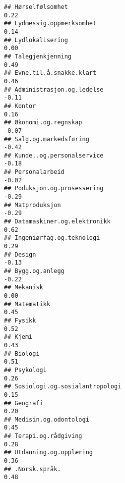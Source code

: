\documentclass[
]{article}
\begin{document}
\begin{verbatim}
## Hørselfølsomhet                                                                   0.22
## Lydmessig.oppmerksomhet                                                           0.14
## Lydlokalisering                                                                   0.00
## Talegjenkjenning                                                                  0.49
## Evne.til.å.snakke.klart                                                           0.46
## Administrasjon.og.ledelse                                                        -0.11
## Kontor                                                                            0.16
## Økonomi.og.regnskap                                                              -0.07
## Salg.og.markedsføring                                                            -0.42
## Kunde..og.personalservice                                                        -0.18
## Personalarbeid                                                                   -0.02
## Poduksjon.og.prosessering                                                        -0.29
## Matproduksjon                                                                    -0.29
## Datamaskiner.og.elektronikk                                                       0.62
## Ingeniørfag.og.teknologi                                                          0.29
## Design                                                                           -0.13
## Bygg.og.anlegg                                                                   -0.22
## Mekanisk                                                                          0.00
## Matematikk                                                                        0.45
## Fysikk                                                                            0.52
## Kjemi                                                                             0.43
## Biologi                                                                           0.51
## Psykologi                                                                         0.26
## Sosiologi.og.sosialantropologi                                                    0.15
## Geografi                                                                          0.20
## Medisin.og.odontologi                                                             0.45
## Terapi.og.rådgiving                                                               0.28
## Utdanning.og.opplæring                                                            0.36
## .Norsk.språk.                                                                     0.48

\end{verbatim}
\end{document}

